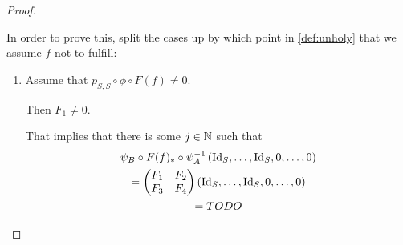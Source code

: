 \begin{proof}
\begin{enumerate}
{            In order to prove this, split the cases up by which point in \autoref{def:unholy} that we assume \( f \) not to fulfill:
            \begin{enumerate}
                \item {
                    Assume that \( p_{S, S} \circ \phi \circ F(f) \neq 0 \).

                    Then \( F_1 \neq 0 \).

                    That implies that there is some \( j \in {\mathbb{N}} \) such that 
                    \begin{multline*}
                        \psi_B \circ F(f)_* \circ \psi_A^{-1} \left( \operatorname{Id}_S, \dots, \operatorname{Id}_S, 0, \dots, 0 \right) \\
                        =
                        \begin{pmatrix}
                            F_1 & F_2 \\
                            F_3 & F_4
                        \end{pmatrix}
                        \left( \operatorname{Id}_S, \dots, \operatorname{Id}_S, 0, \dots, 0 \right) \\
                        =
                        TODO
                    \end{multline*}
                }
            \end{enumerate} 
        }
    \end{enumerate}
\end{proof}